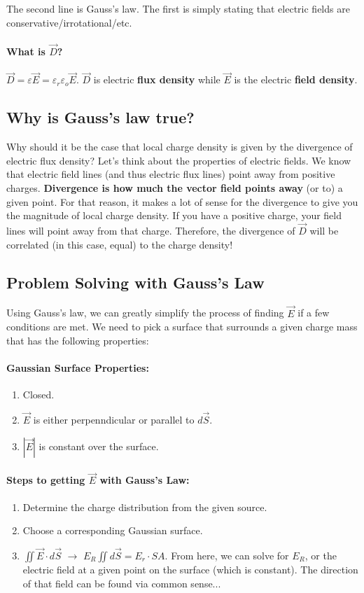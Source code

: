 \documentclass[a4paper,12pt]{report}
\begin{document}
The second line is Gauss's law. The first is simply stating that electric fields are conservative/irrotational/etc.

\paragraph{What is $\vec{D}$? } $\vec{D} = \varepsilon \vec{E} = \varepsilon_r \varepsilon_o \vec{E}$. $\vec{D}$ is electric \textbf{flux density} while 
$\vec{E}$ is the electric \textbf{field density}.

\subsection{Why is Gauss's law true?} 

Why should it be the case that local charge density is given by the divergence of electric flux density? Let's 
think about the properties of electric fields. We know that electric field lines (and thus electric flux lines) point away from positive charges. 
\textbf{Divergence is how much the vector field points away} (or to) a given point. For that reason, it makes a lot of sense for the divergence to give 
you the magnitude of local charge density. If you have a positive charge, your field lines will point away from that charge. Therefore, the divergence of 
$\vec{D}$ will be correlated (in this case, equal) to the charge density!

\subsection{Problem Solving with Gauss's Law}
Using Gauss's law, we can greatly simplify the process of finding $\vec{E}$ if a few conditions are met. We need to pick a surface that surrounds a 
given charge mass that has the following properties:

\paragraph{Gaussian Surface Properties: }
\begin{enumerate}
\item Closed.
\item $\vec{E}$ is either perpenndicular or parallel to $d\vec{S}$.
\item $|\vec{E}|$ is constant over the surface.
\end{enumerate}

\paragraph{Steps to getting $\vec{E}$ with Gauss's Law:}
\begin{enumerate}
\item Determine the charge distribution from the given source. 
\item Choose a corresponding Gaussian surface.
\item $\iint \vec{E} \cdot d\vec{S} \,\, \to \,\, E_R \iint d\vec{S} = E_r\cdot SA$. From here, we can solve for $E_R$, or the 
electric field at a given point on the surface (which is constant). The direction of that field can be found via common sense...
\end{enumerate}
\end{document}
